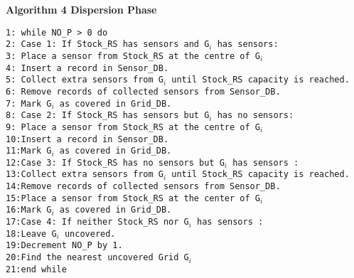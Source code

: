 \documentclass{article}
\begin{document}
\noindent\textbf{Algorithm 4 Dispersion Phase}

\noindent\texttt{1: \quad while NO\_P > 0 do} \\
\noindent\texttt{2: \quad \quad Case 1: If Stock\_RS has sensors and G$_i$ has sensors:} \\
\noindent\texttt{3: \quad \quad \quad Place a sensor from Stock\_RS at the centre of G$_i$} \\
\noindent\texttt{4: \quad \quad \quad Insert a record in Sensor\_DB.} \\
\noindent\texttt{5: \quad \quad \quad Collect extra sensors from G$_i$ until Stock\_RS capacity is reached.} \\
\noindent\texttt{6: \quad \quad \quad Remove records of collected sensors from Sensor\_DB.} \\
\noindent\texttt{7: \quad \quad \quad Mark G$_i$ as covered in Grid\_DB.} \\
\noindent\texttt{8: \quad \quad Case 2: If Stock\_RS has sensors but G$_i$ has no sensors:} \\
\noindent\texttt{9: \quad \quad \quad Place a sensor from Stock\_RS at the centre of G$_i$} \\
\noindent\texttt{10:\quad \quad \quad Insert a record in Sensor\_DB.} \\
\noindent\texttt{11:\quad \quad \quad Mark G$_i$ as covered in Grid\_DB.} \\
\noindent\texttt{12:\quad \quad Case 3: If Stock\_RS has no sensors but G$_i$ has sensors :} \\
\noindent\texttt{13:\quad \quad \quad Collect extra sensors from G$_i$ until Stock\_RS capacity is reached.} \\
\noindent\texttt{14:\quad \quad \quad Remove records of collected sensors from Sensor\_DB.} \\
\noindent\texttt{15:\quad \quad \quad Place a sensor from Stock\_RS at the center of G$_i$} \\
\noindent\texttt{16:\quad \quad \quad Mark G$_i$ as covered in Grid\_DB.} \\
\noindent\texttt{17:\quad \quad Case 4: If neither Stock\_RS nor G$_i$ has sensors :} \\
\noindent\texttt{18:\quad \quad \quad Leave G$_i$ uncovered.} \\
\noindent\texttt{19:\quad \quad Decrement NO\_P by 1.} \\
\noindent\texttt{20:\quad \quad Find the nearest uncovered Grid G$_i$} \\
\noindent\texttt{21:\quad end while}
\end{document}
